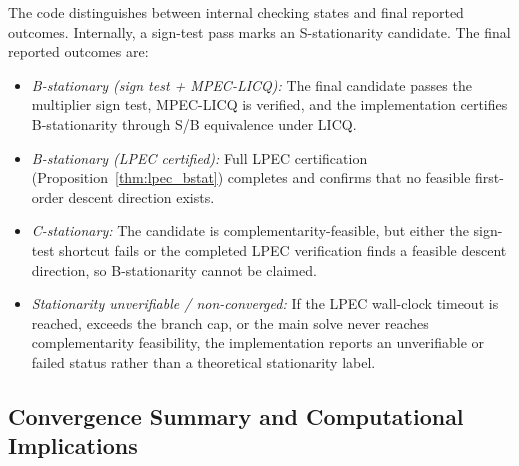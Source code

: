 The code distinguishes between internal checking states and final
reported outcomes. Internally, a sign-test pass marks an
S-stationarity candidate. The final reported outcomes are:
\begin{itemize}
  \item[-] \emph{B-stationary (sign test + MPEC-LICQ):} The final candidate
  passes the multiplier sign test, MPEC-LICQ is verified, and the
  implementation certifies B-stationarity through S/B equivalence under
  LICQ.
  \item[-] \emph{B-stationary (LPEC certified):} Full LPEC certification
  (Proposition~\ref{thm:lpec_bstat}) completes and confirms that no
  feasible first-order descent direction exists.
  \item[-] \emph{C-stationary:} The candidate is complementarity-feasible,
  but either the sign-test shortcut fails or the completed LPEC verification
  finds a feasible descent direction, so B-stationarity cannot be
  claimed.
  \item[-] \emph{Stationarity unverifiable / non-converged:} If the LPEC
  wall-clock timeout is reached, exceeds the branch cap, or the main solve never
  reaches complementarity feasibility, the implementation reports an
  unverifiable or failed status rather than a theoretical stationarity
  label.
\end{itemize}

\subsection{Convergence Summary and Computational Implications}
\label{sec:convergence_summary}

